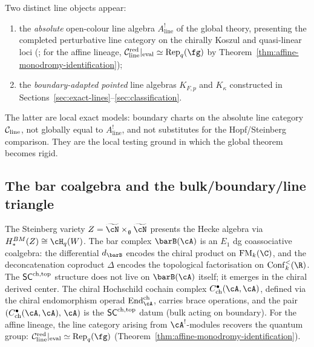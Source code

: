 Two distinct line objects appear:
\begin{enumerate}[label=(\roman*),leftmargin=1.8em]
\item the \emph{absolute} open-colour line algebra
$A^!_{\mathrm{line}}$ of the global theory, presenting the completed
perturbative line category on the chirally Koszul and quasi-linear
loci (\cite{DNP25}; for the affine lineage,
$\cC_{\mathrm{line}}^{\mathrm{red}}|_{\mathrm{eval}} \simeq
\mathrm{Rep}_q(\fg)$ by
Theorem~\ref{thm:affine-monodromy-identification});
\item the \emph{boundary-adapted pointed} line algebras $K_{F,p}$ and $K_\kappa$ constructed in Sections~\ref{sec:exact-lines}--\ref{sec:classification}.
\end{enumerate}
The latter are local exact models: boundary charts on the absolute line
category $\mathcal C_{\mathrm{line}}$, not globally equal to
$A^!_{\mathrm{line}}$, and not substitutes for the Hopf/Steinberg
comparison. They are the local testing ground in which the global
theorem becomes rigid.

\subsection{The bar coalgebra and the bulk/boundary/line triangle}

The Steinberg variety $Z = \widetilde{\cN} \times_{\mathfrak g}
\widetilde{\cN}$ presents the Hecke algebra via
$H_*^{BM}(Z) \cong \cH_q(W)$. The bar complex $\barB(\cA)$ is
an $E_1$ dg coassociative coalgebra: the differential $d_{\barB}$
encodes the chiral product on $\FM_k(\C)$, and the deconcatenation
coproduct $\Delta$ encodes the topological factorisation on
$\Conf_k^{<}(\R)$. The $\mathsf{SC}^{\mathrm{ch,top}}$ structure does not live on
$\barB(\cA)$ itself; it emerges in the chiral derived center.
The chiral Hochschild cochain complex
$C^\bullet_{\mathrm{ch}}(\cA,\cA)$, defined via the chiral
endomorphism operad $\mathrm{End}^{\mathrm{ch}}_{\cA}$, carries brace
operations, and the pair $(C^\bullet_{\mathrm{ch}}(\cA,\cA),\,\cA)$
is the $\mathsf{SC}^{\mathrm{ch,top}}$ datum (bulk acting on boundary). For the affine
lineage, the line category arising from $\cA^!$-modules recovers the
quantum group:
$\cC_{\mathrm{line}}^{\mathrm{red}}|_{\mathrm{eval}} \simeq
\mathrm{Rep}_q(\fg)$
(Theorem~\ref{thm:affine-monodromy-identification}).

